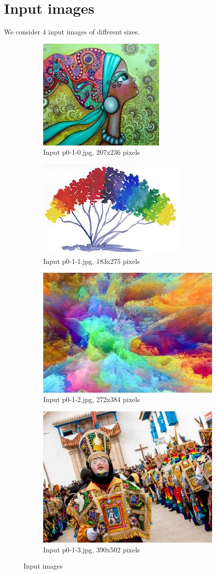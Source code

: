 \section{Input images}
We consider 4 input images of different sizes.
\begin{figure}[h!]
\centering
\begin{subfigure}{0.5\textwidth}
  \centering
  \includegraphics[width=0.5\linewidth]{../input/p0-1-0.jpg}
  \caption{Input p0-1-0.jpg, 207x236 pixels}
  \label{fig:sfig1}
\end{subfigure}%
\begin{subfigure}{0.5\textwidth}
  \centering
  \includegraphics[width=0.5\linewidth]{../input/p0-1-1.jpg}
  \caption{Input p0-1-1.jpg, 183x275 pixels}
  \label{fig:sfig2}
\end{subfigure}
\begin{subfigure}{0.5\textwidth}
  \centering
  \includegraphics[width=0.5\linewidth]{../input/p0-1-2.jpg}
  \caption{Input p0-1-2.jpg, 272x384 pixels}
  \label{fig:sfig1}
\end{subfigure}%
\begin{subfigure}{0.5\textwidth}
  \centering
  \includegraphics[width=0.5\linewidth]{../input/p0-1-3.jpg}
  \caption{Input p0-1-3.jpg, 390x502 pixels}
  \label{fig:sfig2}
\end{subfigure}
 \caption{Input images}
\label{fig:fig}
\end{figure}
